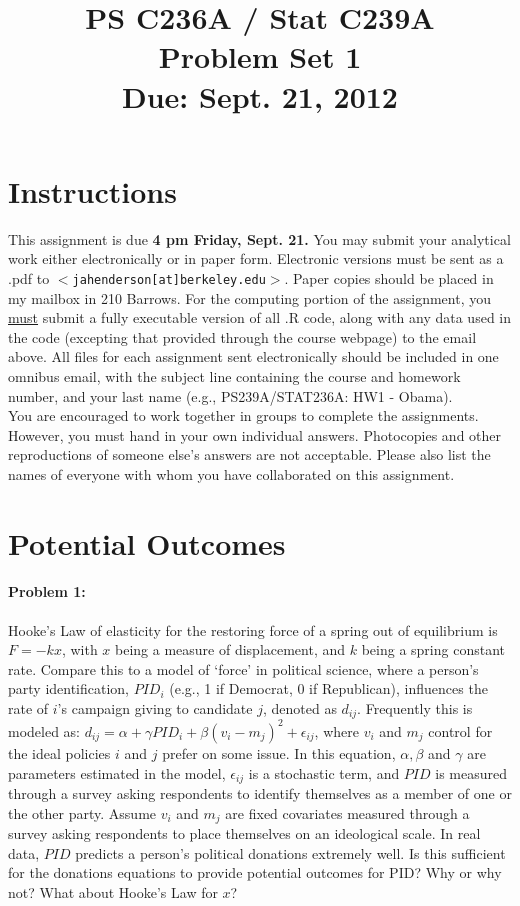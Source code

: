 \documentclass{article}
\title{PS C236A / Stat C239A \\ Problem Set 1 \\ Due: Sept. 21, 2012}
\date{}
\begin{document}
\maketitle
\vspace{-4em}
\section*{Instructions}
This assignment is due {\bf 4 pm Friday, Sept. 21.}  You may submit
your analytical work either electronically or in paper form.
Electronic versions must be sent as a .pdf to
$<$\texttt{jahenderson[at]berkeley.edu}$>$. Paper copies should be
placed in my mailbox in 210 Barrows.  For the computing portion of the
assignment, you \underline{must} submit a fully executable version of
all .R code, along with any data used in the code (excepting that
provided through the course webpage) to the email above.  All files
for each assignment sent electronically should be included in one
omnibus email, with the subject line containing the course and
homework number, and your last name (e.g., PS239A/STAT236A: HW1 - Obama).\\







\noindent You are encouraged to work together in groups to complete
the assignments. However, you must hand in your own individual
answers. Photocopies and other reproductions of someone else’s answers
are not acceptable. Please also list the names of everyone with
whom you have collaborated on this assignment.



\section*{Potential Outcomes}

\paragraph{Problem 1:}
Hooke's Law of elasticity for the restoring force of a spring out of
equilibrium is $F=-kx$, with $x$ being a measure of displacement, and
$k$ being a spring constant rate.  Compare this to a model of `force'
in political science, where a person's party identification, $PID_i$
(e.g., 1 if Democrat, 0 if Republican), influences the rate of $i$'s
campaign giving to candidate $j$, denoted as $d_{ij}$.  Frequently
this is modeled as: $d_{ij}=\alpha+\gamma PID_i+\beta(v_i-m_j)^2 +
\epsilon_{ij}$, where $v_i$ and $m_j$ control for the ideal policies
$i$ and $j$ prefer on some issue.  In this equation, $\alpha, \beta$
and $\gamma$ are parameters estimated in the model, $\epsilon_{ij}$ is
a stochastic term, and $PID$ is measured through a survey asking
respondents to identify themselves as a member of one or the other
party.  Assume $v_i$ and $m_j$ are fixed covariates measured through a
survey asking respondents to place themselves on an ideological scale.
In real data, $PID$ predicts a person's political donations extremely
well.  Is this sufficient for the donations equations to provide
potential outcomes for PID?  Why or why not?  What about Hooke's Law
for $x$?
\end{document}

